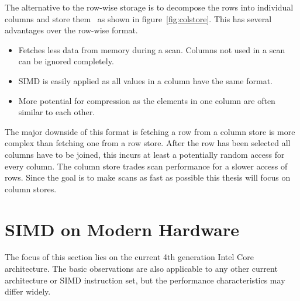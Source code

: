 The alternative to the row-wise storage is to decompose the rows into individual
columns and store them~\cite{copeland} as shown in figure~\ref{fig:colstore}.
This has several advantages over the row-wise format.

\begin{itemize}
  \item Fetches less data from memory during a scan. Columns not used in a scan
    can be ignored completely.
  \item SIMD is easily applied as all values in a column have the same format.
  \item More potential for compression as the elements in one column are often
    similar to each other.
\end{itemize}

The major downside of this format is fetching a row from a column store is more
complex than fetching one from a row store. After the row has been selected all
columns have to be joined, this incurs at least a potentially random access for
every column. The column store trades scan performance for a slower access of
rows. Since the goal is to make scans as fast as possible this thesis will focus
on column stores.

\section{SIMD on Modern Hardware}

The focus of this section lies on the current 4th generation Intel Core
architecture. The basic observations are also applicable to any other current
architecture or SIMD instruction set, but the performance characteristics may
differ widely.

